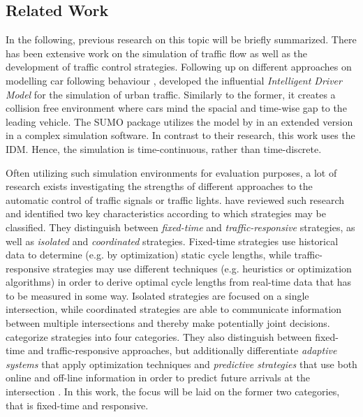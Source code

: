 \documentclass[10pt]{article}
\begin{document}
\subsection{Related Work}
\label{sec:related-work}
In the following, previous research on this topic will be briefly summarized. There has been extensive work on the simulation of traffic flow as well as the development of traffic control strategies. Following up on different approaches on modelling car following behaviour \citep[e.g.][]{gipps1981behavioural}, \citet{treiber2000congested} developed the influential \textit{Intelligent Driver Model} for the simulation of urban traffic. Similarly to the former, it creates a collision free environment where cars mind the  spacial and time-wise gap to the leading vehicle. The SUMO package \citep{krajzewicz2002sumo, behrisch2011sumo} utilizes the model by \citep{gipps1981behavioural} in an extended version \citep{krauss1998microscopic} in a complex simulation software. In contrast to their research, this work uses the IDM. Hence, the simulation is time-continuous, rather than time-discrete.

Often utilizing such simulation environments for evaluation purposes, a lot of research exists investigating the strengths of different approaches to the automatic control of traffic signals or traffic lights. \citet{papageorgiou2003review} have reviewed such research and identified two key characteristics according to which strategies may be classified. They distinguish between \textit{fixed-time} and \textit{traffic-responsive} strategies, as well as \textit{isolated} and \textit{coordinated} strategies. Fixed-time strategies use historical data to determine (e.g. by optimization) static cycle lengths, while traffic-responsive strategies may use different techniques (e.g. heuristics or optimization algorithms) in order to derive optimal cycle lengths from real-time data that has to be measured in some way. Isolated strategies are focused on a single intersection, while coordinated strategies are able to communicate information between multiple intersections and thereby make potentially joint decisions. \citet{coll2013linear} categorize strategies into four categories. They also distinguish between fixed-time and traffic-responsive approaches, but additionally differentiate \textit{adaptive systems} that apply optimization techniques and \textit{predictive strategies} that use both online and off-line information in order to predict future arrivals at the intersection \citep{coll2013linear}. In this work, the focus will be laid on the former two categories, that is fixed-time and responsive.
\end{document}
